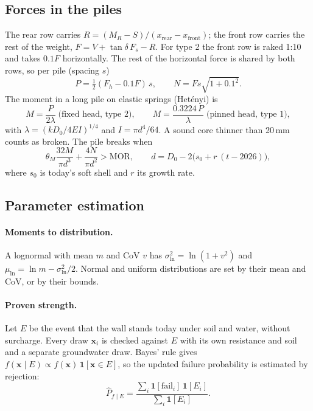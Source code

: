 \subsection{Forces in the piles}\label{app:prob-piles}

The rear row carries $R = (M_R - S)/(x_\text{rear} - x_\text{front})$; the
front row carries the rest of the weight, $F = V + \tan\delta\,F_s - R$. For
type 2 the front row is raked 1:10 and takes $0.1F$ horizontally. The rest of
the horizontal force is shared by both rows, so per pile (spacing $s$)
\begin{equation}
P = \tfrac12 (F_h - 0.1F)\,s, \qquad N = F s \sqrt{1 + 0.1^2}.
\end{equation}
The moment in a long pile on elastic springs (Hetényi) is
\begin{equation}
M = \frac{P}{2\lambda} \;\text{(fixed head, type 2)}, \qquad
M = \frac{0.3224\,P}{\lambda} \;\text{(pinned head, type 1)},
\end{equation}
with $\lambda = \left(k D_0 / 4 E I\right)^{1/4}$ and $I = \pi d^4/64$.
A sound core thinner than 20\,mm counts as broken.
The pile breaks when
\begin{equation}
\theta_M \frac{32 M}{\pi d^3} + \frac{4N}{\pi d^2} > \text{MOR},
\qquad d = D_0 - 2\bigl(s_0 + r\,(t - 2026)\bigr),
\end{equation}
where $s_0$ is today's soft shell and $r$ its growth rate.

\subsection{Parameter estimation}\label{app:prob-estimation}

\paragraph{Moments to distribution.} A lognormal with mean $m$ and CoV $v$ has
$\sigma_{\ln}^2 = \ln(1 + v^2)$ and $\mu_{\ln} = \ln m - \sigma_{\ln}^2/2$.
Normal and uniform distributions are set by their mean and CoV, or by their
bounds.

\paragraph{Proven strength.} Let $E$ be the event that the wall stands today
under soil and water, without surcharge. Every draw $\mathbf{x}_i$ is checked
against $E$ with its own resistance and soil and a separate groundwater draw.
Bayes' rule gives $f(\mathbf{x} \mid E) \propto f(\mathbf{x})\,
\mathbf{1}[\mathbf{x} \in E]$, so the updated failure probability is
estimated by rejection:
\begin{equation}
\hat P_{f\mid E} = \frac{\sum_i \mathbf{1}[\text{fail}_i]\,\mathbf{1}[E_i]}{\sum_i \mathbf{1}[E_i]}.
\end{equation}

